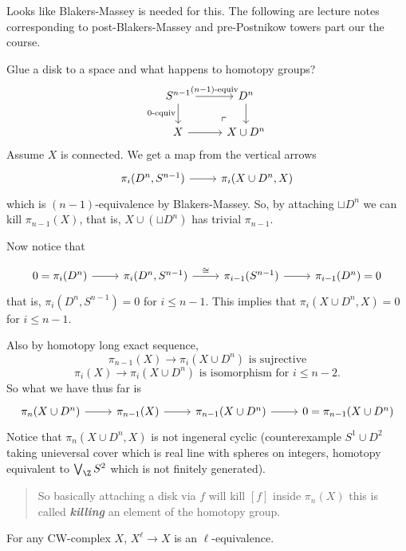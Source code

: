 \begin{remark}
{\color{cyan}Looks like Blakers-Massey is needed for this. The following are lecture notes corresponding to post-Blakers-Massey and pre-Postnikow towers part our the course.}

Glue a disk to a space and what happens to homotopy groups?
\[\begin{tikzcd}
	S^{n-1}\arrow[r,"(n-1)\text{-equiv}"]\arrow[d,"0\text{-equiv}",swap]&D^n\arrow[d]\\
	X\arrow[r]&X\cup D^n\arrow[ul, phantom, "\ulcorner", very near start]
\end{tikzcd}\]
Assume $X$ is connected. We get a map from the vertical arrows
\[\begin{tikzcd}
	\pi_i(D^n,S^{n-1})\arrow[r]&\pi_i(X\cup D^n,X)
\end{tikzcd}\]
which is $(n-1)$-equivalence by Blakers-Massey. So, by attaching $\sqcup D^n$ we can kill $\pi_{n-1}(X)$, that is, $X\cup(\sqcup D^n)$ has trivial $\pi_{n-1}$.

Now notice that

\[\begin{tikzcd}
	0=\pi_i(D^n)\arrow[r]&\pi_i(D^n,S^{n-1})\arrow[r,"\cong"]&\pi_{i-1}(S^{n-1})\arrow[r]&\pi_{i-1}(D^n)=0
\end{tikzcd}\]
that is, $\pi_i(D^n,S^{n-1})=0$ for $i\leq n-1$. This implies that $\pi_i(X\cup D^n,X)=0$ for $i\leq n-1$.

Also by homotopy long exact sequence,
\[\pi_{n-1}(X)\to \pi_i(X\cup D^n)\text{ is sujrective}\]
\[\pi_i(X)\to \pi_{i}(X\cup D^n)\text{ is isomorphism for }i\leq n-2.\]
So what we have thus far is
\[\begin{tikzcd}
	\pi_n(X\cup D^n)\arrow[r]&\pi_{n-1}(X)\arrow[r]&\pi_{n-1}(X\cup D^n)\arrow[r]&0=\pi_{n-1}(X\cup D^n)
\end{tikzcd}\]
Notice that $\pi_n(X\cup D^n,X)$ is not ingeneral cyclic (counterexample $S^1\cup D^2$ taking unieversal cover which is real line with spheres on integers, homotopy equivalent to $\bigvee_\Z S^2$ which is not finitely generated).

\begin{quote}
	{\color{red} So basically attaching a disk via $f$ will kill $[f]$ inside $\pi_n(X)$ this is called \textbf{\textit{killing}} an element of the homotopy group.}
\end{quote}

\begin{prop}
	For any CW-complex $X$, $X^\ell\to X$ is an $\ell$-equivalence.
\end{prop}


\end{remark}
